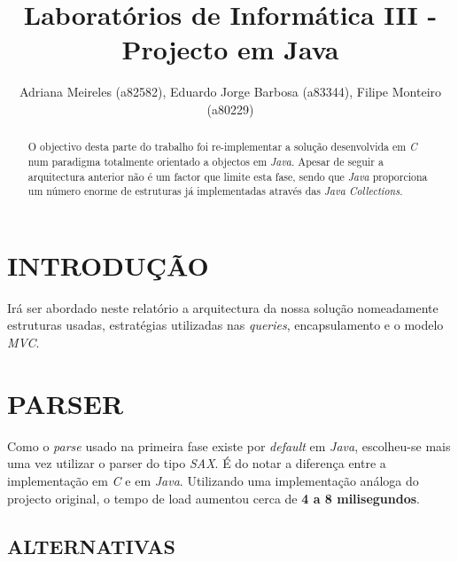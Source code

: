 \documentclass[letterpaper, 10 pt, conference]{IEEEtran} %
\title{\LARGE \bf
Laboratórios de Informática III - Projecto em Java
}
\author{Adriana Meireles (a82582), Eduardo Jorge Barbosa (a83344), Filipe Monteiro (a80229)%
}
\begin{document}
\maketitle
\thispagestyle{empty}
\pagestyle{empty}


\begin{abstract}

O objectivo desta parte do trabalho foi re-implementar a solução desenvolvida em \textit{C} num paradigma totalmente orientado a objectos em \textit{Java}. Apesar de seguir a arquitectura anterior não é um factor que limite esta fase, sendo que \textit{Java} proporciona um número enorme de estruturas já implementadas através das \textit{Java Collections}.

\end{abstract}


\section{INTRODUÇÃO}

Irá ser abordado neste relatório a arquitectura da nossa solução nomeadamente estruturas usadas, estratégias utilizadas nas \textit{queries}, encapsulamento e o modelo \textit{MVC}.


\section{PARSER}

Como o \textit{parse} usado na primeira fase existe por \textit{default} em \textit{Java}, escolheu-se mais uma vez utilizar o parser do tipo \textit{SAX}.
É do notar a diferença entre a implementação em \textit{C} e em \textit{Java}. Utilizando uma implementação análoga do projecto original, o tempo de load aumentou cerca de \textbf{4 a 8 milisegundos}.

\subsection{ALTERNATIVAS}
\end{document}
